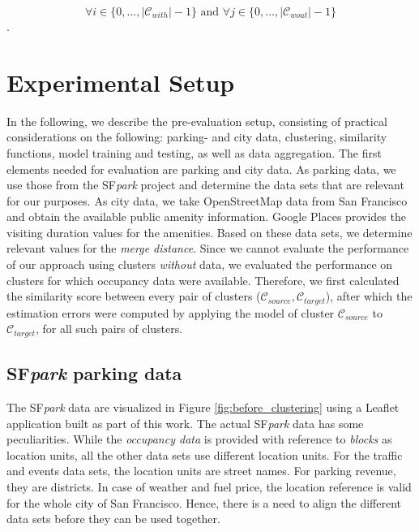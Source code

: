 $$\forall i \in \{0,...,|\mathcal{C}_{with}|-1\} \text{ and } \forall j \in \{0,...,|\mathcal{C}_{wout}|-1\}$$.

\section{Experimental Setup}
In the following, we describe the pre-evaluation setup, consisting of practical considerations on the following: parking- and city data, clustering, similarity functions, model training and testing, as well as data aggregation.
The first elements needed for evaluation are parking and city data. As parking data, we use those from the SF\textit{park} project and determine the data sets that are relevant for our purposes. As city data, we take OpenStreetMap data from San Francisco and obtain the available public amenity information. Google Places provides the visiting duration values for the amenities. Based on these data sets, we determine relevant values for the \textit{merge distance}. Since we cannot evaluate the performance of our approach using clusters \textit{without} data, we evaluated the performance on clusters for which occupancy data were available. 
Therefore, we first calculated the similarity score between every pair of clusters ($\mathcal{C}_{source}, \mathcal{C}_{target}$), after which the estimation errors were computed by applying the model of cluster $\mathcal{C}_{source}$ to $\mathcal{C}_{target}$, for all such pairs of clusters.

\subsection{SF\textit{park} parking data}
\label{experimental_setup:sfpark}
The SF\textit{park} data are visualized in Figure \ref{fig:before_clustering} using a Leaflet application built as part of this work.
The actual SF\textit{park} data has some peculiarities.
While the \textit{occupancy data} is provided with reference to \textit{blocks} as location units, all the other data sets use different location units.
For the traffic and events data sets, the location units are street names.
For parking revenue, they are districts.
In case of weather and fuel price, the location reference is valid for the whole city of San Francisco. 
Hence, there is a need to align the different data sets before they can be used together.

